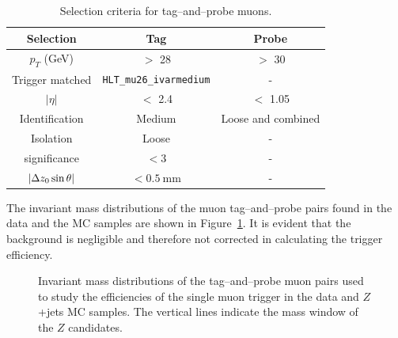 \begin{table}[!htb]
	\centering
	\begin{tabular}{ccc}
		\hline
		\hline
		Selection           & Tag                               & Probe                     \\
		\hline
		$p_{T}$ (GeV)       & $>$ 28                            & $>$ 30                    \\
		Trigger matched     & \texttt{HLT\_mu26\_ivarmedium}    & -                         \\
		$|\eta|$            & $<$ 2.4                           & $<$ 1.05                  \\
		Identification      & Medium                            & Loose and combined        \\
		Isolation           & Loose                             & -                         \\
		\dzero significance & $< 3$                             & -                         \\
		$|\Delta z_{0} \sin{\theta}|$ & $< 0.5~\si{\mm}$       & -                         \\
		\hline
		\hline
	\end{tabular}
	\caption{Selection criteria for tag--and--probe muons.}
	\label{tab:ZmmSelection}
\end{table}

The invariant mass distributions of the muon tag--and--probe pairs found in the data and the MC samples are shown in Figure~\ref{fig:MuonTrigMass}. It is evident that the background is negligible and therefore not corrected in calculating the trigger efficiency.

\begin{figure}[!htb]
    \centering
    \caption{Invariant mass distributions of the tag--and--probe muon pairs used to study the efficiencies of the single muon trigger in the data and $Z$+jets MC samples. The vertical lines indicate the mass window of the $Z$ candidates.
    }
    \label{fig:MuonTrigMass}
\end{figure}


